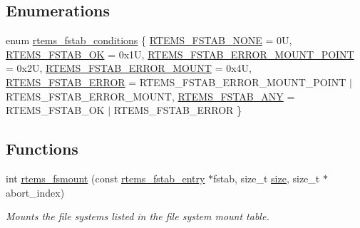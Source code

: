 \subsection*{Enumerations}
\begin{DoxyCompactItemize}
\item 
enum \mbox{\hyperlink{group__rtems__fstab_gabcbeff39e673bbef9ec0960f64d19228}{rtems\+\_\+fstab\+\_\+conditions}} \{ \newline
\mbox{\hyperlink{group__rtems__fstab_ggabcbeff39e673bbef9ec0960f64d19228a02b814a4e2912b3798f9461f21c653d0}{R\+T\+E\+M\+S\+\_\+\+F\+S\+T\+A\+B\+\_\+\+N\+O\+NE}} = 0U, 
\mbox{\hyperlink{group__rtems__fstab_ggabcbeff39e673bbef9ec0960f64d19228a599040e2f9b9138f579b4afe2d89e74f}{R\+T\+E\+M\+S\+\_\+\+F\+S\+T\+A\+B\+\_\+\+OK}} = 0x1U, 
\mbox{\hyperlink{group__rtems__fstab_ggabcbeff39e673bbef9ec0960f64d19228a45c5b0422063b6c6f7639592599a4a14}{R\+T\+E\+M\+S\+\_\+\+F\+S\+T\+A\+B\+\_\+\+E\+R\+R\+O\+R\+\_\+\+M\+O\+U\+N\+T\+\_\+\+P\+O\+I\+NT}} = 0x2U, 
\mbox{\hyperlink{group__rtems__fstab_ggabcbeff39e673bbef9ec0960f64d19228abea4e604d901dfde4675a0a371e4ff32}{R\+T\+E\+M\+S\+\_\+\+F\+S\+T\+A\+B\+\_\+\+E\+R\+R\+O\+R\+\_\+\+M\+O\+U\+NT}} = 0x4U, 
\newline
\mbox{\hyperlink{group__rtems__fstab_ggabcbeff39e673bbef9ec0960f64d19228a4f7b97e87454e1faea9e4157d8da1c35}{R\+T\+E\+M\+S\+\_\+\+F\+S\+T\+A\+B\+\_\+\+E\+R\+R\+OR}} = R\+T\+E\+M\+S\+\_\+\+F\+S\+T\+A\+B\+\_\+\+E\+R\+R\+O\+R\+\_\+\+M\+O\+U\+N\+T\+\_\+\+P\+O\+I\+NT $\vert$ R\+T\+E\+M\+S\+\_\+\+F\+S\+T\+A\+B\+\_\+\+E\+R\+R\+O\+R\+\_\+\+M\+O\+U\+NT, 
\mbox{\hyperlink{group__rtems__fstab_ggabcbeff39e673bbef9ec0960f64d19228a7d5868d458848d9f2a99fe67d4016360}{R\+T\+E\+M\+S\+\_\+\+F\+S\+T\+A\+B\+\_\+\+A\+NY}} = R\+T\+E\+M\+S\+\_\+\+F\+S\+T\+A\+B\+\_\+\+OK $\vert$ R\+T\+E\+M\+S\+\_\+\+F\+S\+T\+A\+B\+\_\+\+E\+R\+R\+OR
 \}
\end{DoxyCompactItemize}
\subsection*{Functions}
\begin{DoxyCompactItemize}
\item 
int \mbox{\hyperlink{group__rtems__fstab_gaa1e00bfe1aa6bce349c2c73092a39cc6}{rtems\+\_\+fsmount}} (const \mbox{\hyperlink{structrtems__fstab__entry}{rtems\+\_\+fstab\+\_\+entry}} $\ast$fstab, size\+\_\+t \mbox{\hyperlink{sun4u_2tte_8h_a245260f6f74972558f61b85227df5aae}{size}}, size\+\_\+t $\ast$abort\+\_\+index)
\begin{DoxyCompactList}\small\item\em Mounts the file systems listed in the file system mount table. \end{DoxyCompactList}\end{DoxyCompactItemize}


